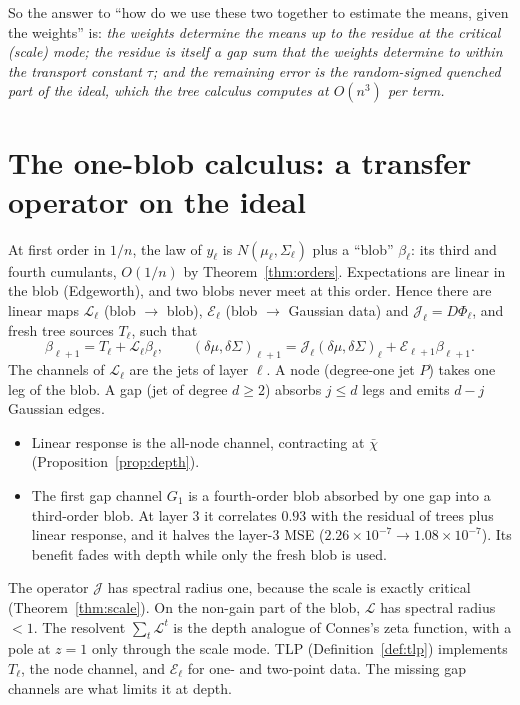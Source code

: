 \documentclass[11pt]{article}
\theoremstyle{definition}
\theoremstyle{remark}
\begin{document}
\noindent So the answer to ``how do we use these two together to estimate the means, given the weights'' is: \emph{the weights determine the means up to the residue at the critical (scale) mode; the residue is itself a gap sum that the weights determine to within the transport constant $\tau$; and the remaining error is the random-signed quenched part of the ideal, which the tree calculus computes at $O(n^3)$ per term.}

\section{The one-blob calculus: a transfer operator on the ideal}\label{sec:blob}
At first order in $1/n$, the law of $y_\ell$ is $N(\mu_\ell,\Sigma_\ell)$ plus a ``blob'' $\beta_\ell$: its third and fourth cumulants, $O(1/n)$ by Theorem~\ref{thm:orders}. Expectations are linear in the blob (Edgeworth), and two blobs never meet at this order. Hence there are linear maps $\mathcal L_\ell$ (blob $\to$ blob), $\mathcal E_\ell$ (blob $\to$ Gaussian data) and $\mathcal J_\ell=D\Phi_\ell$, and fresh tree sources $T_\ell$, such that
\[
\beta_{\ell+1}=T_\ell+\mathcal L_\ell\beta_\ell,\qquad(\delta\mu,\delta\Sigma)_{\ell+1}=\mathcal J_\ell(\delta\mu,\delta\Sigma)_\ell+\mathcal E_{\ell+1}\beta_{\ell+1}.
\]
The channels of $\mathcal L_\ell$ are the jets of layer $\ell$. A node (degree-one jet $P$) takes one leg of the blob. A gap (jet of degree $d\ge2$) absorbs $j\le d$ legs and emits $d-j$ Gaussian edges.
\begin{itemize}
\item Linear response is the all-node channel, contracting at $\bar\chi$ (Proposition~\ref{prop:depth}).
\item The first gap channel $G_1$ is a fourth-order blob absorbed by one gap into a third-order blob. At layer 3 it correlates $0.93$ with the residual of trees plus linear response, and it halves the layer-3 MSE ($2.26\times10^{-7}\to1.08\times10^{-7}$). Its benefit fades with depth while only the fresh blob is used.
\end{itemize}
The operator $\mathcal J$ has spectral radius one, because the scale is exactly critical (Theorem~\ref{thm:scale}). On the non-gain part of the blob, $\mathcal L$ has spectral radius $<1$. The resolvent $\sum_t\mathcal L^t$ is the depth analogue of Connes's zeta function, with a pole at $z=1$ only through the scale mode. TLP (Definition~\ref{def:tlp}) implements $T_\ell$, the node channel, and $\mathcal E_\ell$ for one- and two-point data. The missing gap channels are what limits it at depth.
\end{document}
